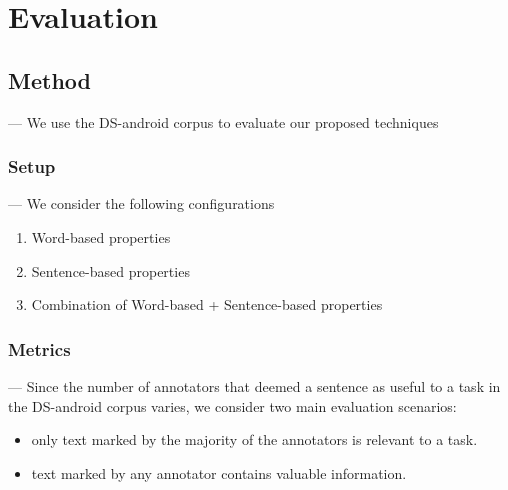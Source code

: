 \section{Evaluation}
\label{cp5:evaluation}




\subsection{Method}



--- We use the \acs{DS-android} corpus to evaluate our proposed techniques  \vspace{3mm}


\subsubsection{Setup}

--- We consider the following configurations  \vspace{3mm}

\begin{enumerate}
    \item Word-based properties
    \item Sentence-based properties
    \item Combination of Word-based + Sentence-based properties
\end{enumerate}



\subsubsection{Metrics}



--- Since the number of annotators that deemed a sentence as useful to a task 
in the \acs{DS-android} corpus varies, we consider 
two main evaluation scenarios:


\begin{itemize}
    \item only text marked by the majority of the annotators is relevant to a task.
    
    \item text marked by any annotator contains valuable information.
\end{itemize}
 


